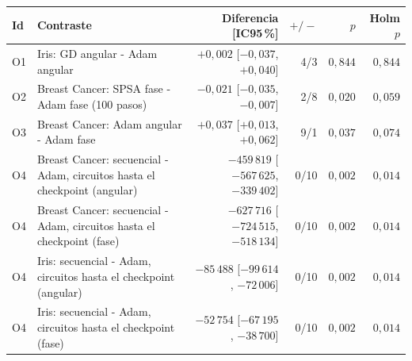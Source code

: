 \begin{tabular}{lp{5.6cm}rrrr}
\toprule
Id & Contraste & Diferencia [IC95\,\%] & $+/-$ & $p$ & Holm $p$ \\
\midrule
O1 & Iris: GD angular - Adam angular & $+0{,}002$ [$-0{,}037$, $+0{,}040$] & 4/3 & $0{,}844$ & $0{,}844$ \\
O2 & Breast Cancer: SPSA fase - Adam fase (100 pasos) & $-0{,}021$ [$-0{,}035$, $-0{,}007$] & 2/8 & $0{,}020$ & $0{,}059$ \\
O3 & Breast Cancer: Adam angular - Adam fase & $+0{,}037$ [$+0{,}013$, $+0{,}062$] & 9/1 & $0{,}037$ & $0{,}074$ \\
O4 & Breast Cancer: secuencial - Adam, circuitos hasta el checkpoint (angular) & $-459\,819$ [$-567\,625$, $-339\,402$] & 0/10 & $0{,}002$ & $0{,}014$ \\
O4 & Breast Cancer: secuencial - Adam, circuitos hasta el checkpoint (fase) & $-627\,716$ [$-724\,515$, $-518\,134$] & 0/10 & $0{,}002$ & $0{,}014$ \\
O4 & Iris: secuencial - Adam, circuitos hasta el checkpoint (angular) & $-85\,488$ [$-99\,614$, $-72\,006$] & 0/10 & $0{,}002$ & $0{,}014$ \\
O4 & Iris: secuencial - Adam, circuitos hasta el checkpoint (fase) & $-52\,754$ [$-67\,195$, $-38\,700$] & 0/10 & $0{,}002$ & $0{,}014$ \\
\bottomrule
\end{tabular}
